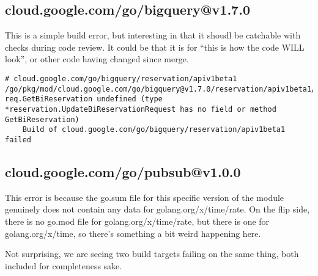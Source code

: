 \subsection{cloud.google.com/go/bigquery@v1.7.0}

This is a simple build error, but interesting in that it shoudl be
catchable with checks during code review. It could be that it is for
``this is how the code WILL look'', or other code having changed since
merge.

\begin{verbatim}
# cloud.google.com/go/bigquery/reservation/apiv1beta1
/go/pkg/mod/cloud.google.com/go/bigquery@v1.7.0/reservation/apiv1beta1/reservation_client.go:728:111: req.GetBiReservation undefined (type *reservation.UpdateBiReservationRequest has no field or method GetBiReservation)
    Build of cloud.google.com/go/bigquery/reservation/apiv1beta1 failed
\end{verbatim}


\subsection{cloud.google.com/go/pubsub@v1.0.0}

This error is because the go.sum file for this specific version of the
module genuinely does not contain any data for
golang.org/x/time/rate. On the flip side, there is no go.mod file for
golang.org/x/time/rate, but there is one for golang.org/x/time, so
there's something a bit weird happening here.

Not surprising, we are seeing two build targets failing on the same
thing, both included for completeness sake.

